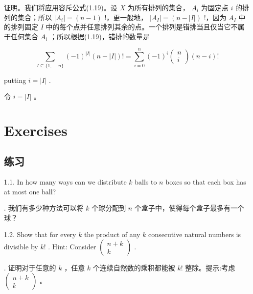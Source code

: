 \documentclass[10pt]{article}
\begin{document}
\begin{tcolorbox}\relax
证明。我们将应用容斥公式(1.19)。设 \(X\) 为所有排列的集合， \({A}_{i}\) 为固定点 \(i\) 的排列的集合；所以 \(\left| {A}_{i}\right|  = \left( {n - 1}\right)\) !，更一般地， \(\left| {A}_{I}\right|  = \left( {n - \left| I\right| }\right)\) !，因为 \({A}_{I}\) 中的排列固定 \(I\) 中的每个点并任意排列其余的点。一个排列是错排当且仅当它不属于任何集合 \({A}_{i}\) ；所以根据(1.19)，错排的数量是
\end{tcolorbox}

\[
\mathop{\sum }\limits_{{I \subseteq  \{ 1,\ldots ,n\} }}{\left( -1\right) }^{\left| I\right| }\left( {n - \left| I\right| }\right) ! = \mathop{\sum }\limits_{{i = 0}}^{n}{\left( -1\right) }^{i}\left( \begin{matrix} n \\  i \end{matrix}\right) \left( {n - i}\right) !
\]

putting \(i = \left| I\right|\) .

\begin{tcolorbox}\relax
令 \(i = \left| I\right|\) 。
\end{tcolorbox}

\section*{Exercises}

\begin{tcolorbox}\relax
\section*{练习}
\end{tcolorbox}

1.1. In how many ways can we distribute \(k\) balls to \(n\) boxes so that each box has at most one ball?

\begin{tcolorbox}. 我们有多少种方法可以将 \(k\) 个球分配到 \(n\) 个盒子中，使得每个盒子最多有一个球？
\end{tcolorbox}

1.2. Show that for every \(k\) the product of any \(k\) consecutive natural numbers is divisible by \(k!\) . Hint: Consider \(\left( \begin{matrix} n + k \\  k \end{matrix}\right)\) .

\begin{tcolorbox}. 证明对于任意的 \(k\) ，任意 \(k\) 个连续自然数的乘积都能被 \(k!\) 整除。提示:考虑 \(\left( \begin{matrix} n + k \\  k \end{matrix}\right)\) 。
\end{tcolorbox}
\end{document}
